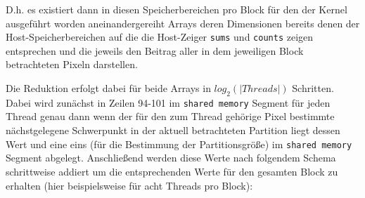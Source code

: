 \documentclass[
    bibliography=totoc, cd=lightcolor, cdmath=false, ngerman]{tudscrreprt}
\begin{document}
\vspace{10pt}

D.h. es existiert dann in diesen Speicherbereichen pro Block für den der Kernel
ausgeführt worden aneinandergereiht Arrays deren Dimensionen bereits denen der
Host-Speicherbereichen auf die die Host-Zeiger \texttt{sums} und
\texttt{counts} zeigen entsprechen und die jeweils den Beitrag aller in dem
jeweiligen Block betrachteten Pixeln darstellen.

Die Reduktion erfolgt dabei für beide Arrays in
$log_2\left(\left|Threads\right|\right)$ Schritten. Dabei wird zunächst in
Zeilen 94-101 im \texttt{shared memory} Segment für jeden Thread genau dann
wenn der für den zum Thread gehörige Pixel bestimmte nächstgelegene Schwerpunkt
in der aktuell betrachteten Partition liegt dessen Wert und eine eins (für die
Bestimmung der Partitionsgröße) im \texttt{shared memory} Segment abgelegt.
Anschließend werden diese Werte nach folgendem Schema schrittweise addiert um
die entsprechenden Werte für den gesamten Block zu erhalten (hier
beispielsweise für acht Threads pro Block):

\vspace{20pt}
\end{document}
